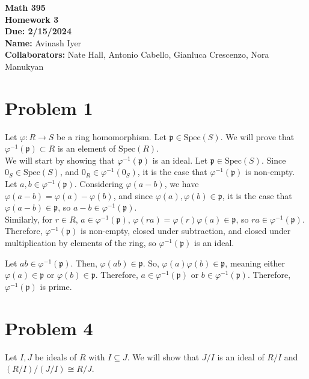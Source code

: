 \documentclass[8pt]{extarticle}
\title{}
\author{}
\date{}
\begin{document}
  \begin{center}
    {\bf \Large Math 395 \\[0.1in]Homework 3 \\[0.1in]
    Due: 2/15/2024}\\[.25in]
    {\bf Name:} {Avinash Iyer}\\[0.15in]
    {\bf Collaborators:} {Nate Hall, Antonio Cabello, Gianluca Crescenzo, Nora Manukyan} \\
  \end{center}
  \section{Problem 1}%
  Let $\varphi: R\rightarrow S$ be a ring homomorphism. Let $\mathfrak{p}\in \text{Spec}(S)$. We will prove that $\varphi^{-1}(\mathfrak{p})\subset R$ is an element of $\text{Spec}(R)$.\\

  We will start by showing that $\varphi^{-1}(\mathfrak{p})$ is an ideal. Let $\mathfrak{p}\in \text{Spec}(S)$. Since $0_{S}\in \text{Spec}(S)$, and $0_R \in \varphi^{-1}(0_S)$, it is the case that $\varphi^{-1}(\mathfrak{p})$ is non-empty.\\

  Let $a,b\in \varphi^{-1}(\mathfrak{p})$. Considering $\varphi(a-b)$, we have $\varphi(a-b) = \varphi(a)-\varphi(b)$, and since $\varphi(a),\varphi(b)\in \mathfrak{p}$, it is the case that $\varphi(a-b)\in \mathfrak{p}$, so $a-b\in \varphi^{-1}(\mathfrak{p})$.\\

  Similarly, for $r\in R$, $a\in \varphi^{-1}(\mathfrak{p})$, $\varphi(ra) = \varphi(r)\varphi(a)\in \mathfrak{p}$, so $ra \in \varphi^{-1}(\mathfrak{p})$. Therefore, $\varphi^{-1}(\mathfrak{p})$ is non-empty, closed under subtraction, and closed under multiplication by elements of the ring, so $\varphi^{-1}(\mathfrak{p})$ is an ideal.

  Let $ab\in \varphi^{-1}(\mathfrak{p})$. Then, $\varphi(ab)\in \mathfrak{p}$. So, $\varphi(a)\varphi(b)\in \mathfrak{p}$, meaning either $\varphi(a)\in \mathfrak{p}$ or $\varphi(b)\in \mathfrak{p}$. Therefore, $a\in \varphi^{-1}(\mathfrak{p})$ or $b\in \varphi^{-1}(\mathfrak{p})$. Therefore, $\varphi^{-1}(\mathfrak{p})$ is prime.
  \section{Problem 4}%
  Let $I,J$ be ideals of $R$ with $I\subseteq J$. We will show that $J/I$ is an ideal of $R/I$ and $(R/I)/(J/I)\cong R/J$.\\
\end{document}
